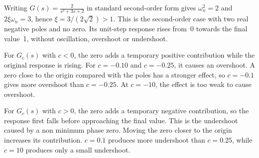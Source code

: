 Writing $G(s)=\frac{2}{s^2+3s+2}$ in standard second-order form gives $\omega_n^2=2$ and $2\xi\omega_n=3$, hence $\xi=3/(2\sqrt{2})>1$. This is the second-order case with two real negative poles and no zero. Its unit-step response rises from~0 towards the final value~1, without oscillation, overshoot or undershoot.

For $G_c(s)$ with $c<0$, the zero adds a temporary positive contribution while the original response is rising. For $c = -0.10$ and $c = -0.25$, it causes an overshoot. A zero close to the origin compared with the poles has a stronger effect, so $c=-0.1$ gives more overshoot than $c=-0.25$. At $c=-10$, the effect is too weak to cause overshoot.

For $G_c(s)$ with $c>0$, the zero adds a temporary negative contribution, so the response first falls before approaching the final value. This is the undershoot caused by a non minimum phase zero. Moving the zero closer to the origin increases its contribution. $c=0.1$ produces more undershoot than $c=0.25$, while $c=10$ produces only a small undershoot.
